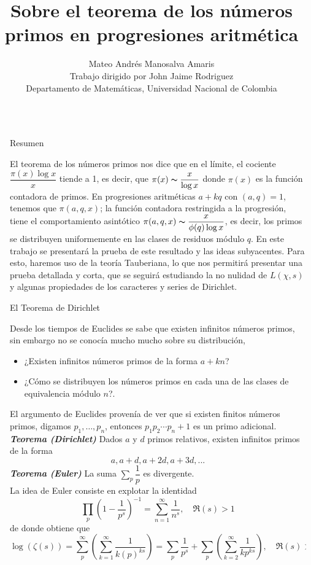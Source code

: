 \documentclass[final]{beamer}
\title{Sobre el teorema de los números primos en progresiones aritmética}
\author{Mateo Andrés Manosalva Amaris\\Trabajo dirigido por John Jaime Rodriguez\\Departamento de Matemáticas, Universidad Nacional de Colombia}
\newlength{\sepwidth}
\newlength{\colwidth}
\newcommand{\separatorcolumn}{\begin{column}{\sepwidth}\end{column}}
\newcommand{\defi}[1]{\textbf{\textsl{#1}}}
\begin{document}
\begin{frame}[t,fragile]
\begin{columns}[t]
\separatorcolumn

\begin{column}{\colwidth}

  \begin{block}{Resumen}

El teorema de los números primos nos dice que en el límite, el cociente $\dfrac{\pi(x)\log x}{x}$ tiende a 1, es decir, que $\pi(x)\thicksim \dfrac{x}{\log x}$ donde $\pi(x)$ es la función contadora de primos. En progresiones aritméticas $a+kq$ con $(a,q)=1$, tenemos que $\pi(a,q,x)$; la función contadora restringida a la progresión, tiene el comportamiento asintótico $\pi(a,q,x)\thicksim \dfrac{x}{\phi(q)\log x}$, es decir, los primos se distribuyen uniformemente en las clases de residuos módulo $q$. En este trabajo se presentará la prueba de este resultado y las ideas subyacentes. Para esto, haremos uso de la teoría Tauberiana, lo que nos permitirá presentar una prueba detallada y corta, que se seguirá estudiando la no nulidad de $L(\chi,s)$ y algunas propiedades de los caracteres y series de Dirichlet.
  \end{block}

\begin{block}{El Teorema de Dirichlet}

Desde los tiempos de Euclides se sabe que existen infinitos números primos, sin embargo no se conocía mucho mucho sobre su distribución,
\begin{itemize}
    \item  ¿Existen infinitos números primos de la forma $a+kn$?
    \item ¿Cómo se distribuyen los números primos en cada  una de las clases de equivalencia módulo $n$?.
\end{itemize}
El argumento de Euclides provenía de ver que si existen finitos números primos, digamos $p_1,\ldots,p_n$, entonces $p_1p_2\cdots p_n+1$ es un primo adicional.\\
\vspace*{0.3cm}
\defi{Teorema (Dirichlet)}
Dados $a$ y $d$ primos relativos, existen infinitos primos de la forma
    $$a, a+d,a+2d,a+3d,...$$
\defi{Teorema (Euler)} La suma $\displaystyle  \sum_{p}\dfrac{1}{p}$ es divergente.\\

La idea de Euler consiste en explotar la identidad 
$$\prod_p \left(1-\dfrac{1}{p^s}\right)^{-1}=\sum_{n=1}^{\infty}\dfrac{1}{n^s},\quad  \Re(s)>1$$
de donde obtiene que 
    $$
\log (\zeta(s))=\sum_p^{\infty}\left(\displaystyle\sum_{k=1}^{\infty} \dfrac{1}{k(p)^{k s}}\right)=\sum_p
\dfrac{1}{p^s}+\sum_{p}\left(\sum_{k=2}^{\infty}\dfrac{1}{kp^{ks}}\right), \quad \Re(s)>1$$
\end{block}
    

\end{column}
\end{columns}
\end{frame}
\end{document}
